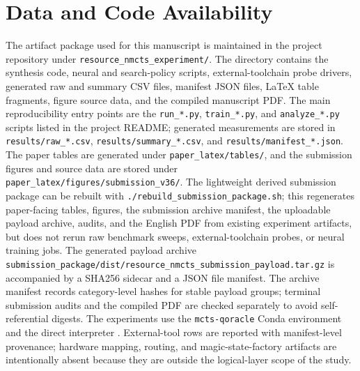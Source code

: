 \documentclass[11pt]{article}
\begin{document}
\section*{Data and Code Availability}

The artifact package used for this manuscript is maintained in the project
repository under \texttt{resource\_nmcts\_experiment/}.  The directory contains
the synthesis code, neural and search-policy scripts, external-toolchain probe
drivers, generated raw and summary CSV files, manifest JSON files, LaTeX table
fragments, figure source data, and the compiled manuscript PDF.  The main
reproducibility entry points are the \texttt{run\_*.py},
\texttt{train\_*.py}, and \texttt{analyze\_*.py} scripts listed in the project
README; generated measurements are stored in \texttt{results/raw\_*.csv},
\texttt{results/summary\_*.csv}, and \texttt{results/manifest\_*.json}.
The paper tables are generated under \texttt{paper\_latex/tables/}, and the
submission figures and source data are stored under
\texttt{paper\_latex/figures/submission\_v36/}.  The lightweight derived
submission package can be rebuilt with
\texttt{./rebuild\_submission\_package.sh}; this regenerates paper-facing
tables, figures, the submission archive manifest, the uploadable payload
archive, audits, and the English PDF from existing experiment artifacts, but
does not rerun raw benchmark sweeps, external-toolchain probes, or neural
training jobs.  The generated payload archive
\texttt{submission\_package/dist/resource\_nmcts\_submission\_payload.tar.gz}
is accompanied by a SHA256 sidecar and a JSON file manifest.  The archive
manifest records category-level hashes for stable payload groups; terminal
submission audits and the compiled PDF are checked separately to avoid
self-referential digests.  The experiments use the
\texttt{mcts-qoracle} Conda environment and the direct interpreter
.  External-tool rows are
reported with manifest-level provenance; hardware mapping, routing, and
magic-state-factory artifacts are intentionally absent because they are outside
the logical-layer scope of the study.



\end{document}
